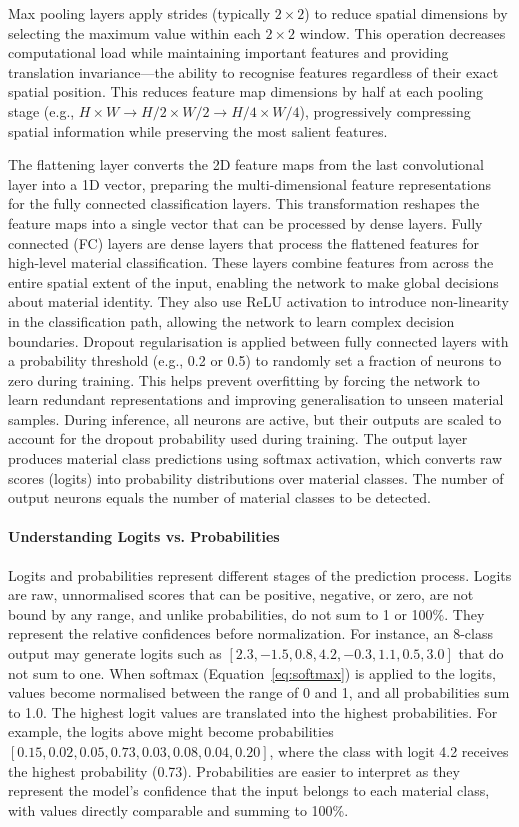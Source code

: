 \documentclass[12pt,a4paper,oneside]{report}
\begin{document}
Max pooling layers apply strides (typically $2 \times 2$) to reduce spatial dimensions by selecting the maximum value within each $2 \times 2$ window. This operation decreases computational load while maintaining important features and providing translation invariance—the ability to recognise features regardless of their exact spatial position. This reduces feature map dimensions by half at each pooling stage (e.g., $H \times W \rightarrow H/2 \times W/2 \rightarrow H/4 \times W/4$), progressively compressing spatial information while preserving the most salient features.

The flattening layer converts the 2D feature maps from the last convolutional layer into a 1D vector, preparing the multi-dimensional feature representations for the fully connected classification layers. This transformation reshapes the feature maps into a single vector that can be processed by dense layers. Fully connected (FC) layers are dense layers that process the flattened features for high-level material classification. These layers combine features from across the entire spatial extent of the input, enabling the network to make global decisions about material identity. They also use ReLU activation to introduce non-linearity in the classification path, allowing the network to learn complex decision boundaries. Dropout regularisation is applied between fully connected layers with a probability threshold (e.g., 0.2 or 0.5) to randomly set a fraction of neurons to zero during training. This helps prevent overfitting by forcing the network to learn redundant representations and improving generalisation to unseen material samples. During inference, all neurons are active, but their outputs are scaled to account for the dropout probability used during training. The output layer produces material class predictions using softmax activation, which converts raw scores (logits) into probability distributions over material classes. The number of output neurons equals the number of material classes to be detected.

\paragraph{Understanding Logits vs. Probabilities}
Logits and probabilities represent different stages of the prediction process. Logits are raw, unnormalised scores that can be positive, negative, or zero, are not bound by any range, and unlike probabilities, do not sum to 1 or 100\%. They represent the relative confidences before normalization. For instance, an 8-class output may generate logits such as $[2.3, -1.5, 0.8, 4.2, -0.3, 1.1, 0.5, 3.0]$ that do not sum to one. When softmax (Equation~\ref{eq:softmax}) is applied to the logits, values become normalised between the range of 0 and 1, and all probabilities sum to 1.0. The highest logit values are translated into the highest probabilities. For example, the logits above might become probabilities $[0.15, 0.02, 0.05, 0.73, 0.03, 0.08, 0.04, 0.20]$, where the class with logit 4.2 receives the highest probability (0.73). Probabilities are easier to interpret as they represent the model's confidence that the input belongs to each material class, with values directly comparable and summing to 100\%.
\end{document}
